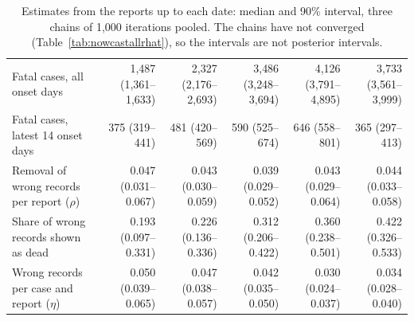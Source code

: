 \documentclass[11pt,a4paper]{article}
\begin{document}
\begin{table}[p]
{\begin{tabular}{lrrrrr}
Fatal cases, all onset days & 1{,}487 (1{,}361--1{,}633) & 2{,}327 (2{,}176--2{,}693) & 3{,}486 (3{,}248--3{,}694) & 4{,}126 (3{,}791--4{,}895) & 3{,}733 (3{,}561--3{,}999) \\
Fatal cases, latest 14 onset days & 375 (319--441) & 481 (420--569) & 590 (525--674) & 646 (558--801) & 365 (297--413) \\
Removal of wrong records per report ($\rho$) & 0.047 (0.031--0.067) & 0.043 (0.030--0.059) & 0.039 (0.029--0.052) & 0.043 (0.029--0.064) & 0.044 (0.033--0.058) \\
Share of wrong records shown as dead & 0.193 (0.097--0.331) & 0.226 (0.136--0.336) & 0.312 (0.206--0.422) & 0.360 (0.238--0.501) & 0.422 (0.326--0.533) \\
Wrong records per case and report ($\eta$) & 0.050 (0.039--0.065) & 0.047 (0.038--0.057) & 0.042 (0.035--0.050) & 0.030 (0.024--0.037) & 0.034 (0.028--0.040) \\
\bottomrule
\end{tabular}}
\caption{Estimates from the reports up to each date: median and 90\% interval, three chains of 1{,}000 iterations pooled. The chains have not converged (Table~\ref{tab:nowcastallrhat}), so the intervals are not posterior intervals.}
\label{tab:nowcastestimates}
\end{table}
\end{document}
